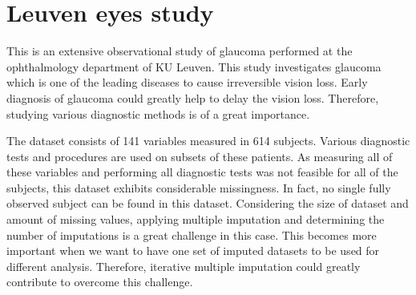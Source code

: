 \documentclass[11pt,a5paper,twoside]{book}
\begin{document}
%
%

\section{Leuven eyes study} 

This is an extensive observational study of glaucoma performed at the ophthalmology department of KU Leuven. This study investigates glaucoma which is one of the leading diseases to cause irreversible vision loss. Early diagnosis of glaucoma could greatly help to delay the vision loss. Therefore, studying various diagnostic methods is of a great importance. 

The dataset consists of 141 variables measured in 614 subjects. Various diagnostic tests and procedures are used on subsets of these patients. As measuring all of these variables and performing all diagnostic tests was not feasible for all of the subjects, this dataset exhibits considerable missingness. In fact, no single fully observed subject can be found in this dataset. Considering the size of dataset and amount of missing values, applying multiple imputation and determining the number of imputations is a great challenge in this case. This becomes more important when we want to have one set of imputed datasets to be used for different analysis. Therefore, iterative multiple imputation could greatly contribute to overcome this challenge.
\end{document}
